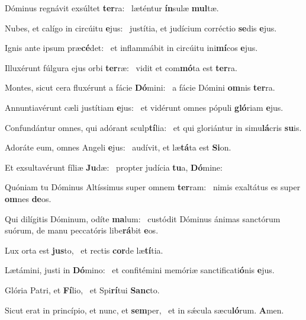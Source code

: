 \item Dóminus regnávit exsúltet \textbf{ter}ra:~\psstar{} læténtur \textbf{ín}sulæ \textbf{mul}tæ.
\item Nubes, et calígo in circúitu \textbf{e}jus:~\psstar{} justítia, et judícium corréctio \textbf{se}dis \textbf{e}jus.
\item Ignis ante ipsum præ\textbf{cé}det:~\psstar{} et inflammábit in circúitu ini\textbf{mí}cos \textbf{e}jus.
\item Illuxérunt fúlgura ejus orbi \textbf{ter}ræ:~\psstar{} vidit et com\textbf{mó}ta est \textbf{ter}ra.
\item Montes, sicut cera fluxérunt a fácie \textbf{Dó}mini:~\psstar{} a fácie Dómini \textbf{om}nis \textbf{ter}ra.
\item Annuntiavérunt cæli justítiam \textbf{e}jus:~\psstar{} et vidérunt omnes pópuli \textbf{gló}riam \textbf{e}jus.
\item Confundántur omnes, qui adórant sculp\textbf{tí}lia:~\psstar{} et qui gloriántur in simu\textbf{lá}cris \textbf{su}is.
\item Adoráte eum, omnes Angeli \textbf{e}jus:~\psstar{} audívit, et læ\textbf{tá}ta est \textbf{Si}on.
\item Et exsultavérunt fíliæ \textbf{Ju}dæ:~\psstar{} propter judícia \textbf{tu}a, \textbf{Dó}mine:
\item Quóniam tu Dóminus Altíssimus super omnem \textbf{ter}ram:~\psstar{} nimis exaltátus es super \textbf{om}nes \textbf{de}os.
\item Qui dilígitis Dóminum, odíte \textbf{ma}lum:~\psstar{} custódit Dóminus ánimas sanctórum suórum, de manu peccatóris libe\textbf{rá}bit \textbf{e}os.
\item Lux orta est \textbf{jus}to,~\psstar{} et rectis \textbf{cor}de læ\textbf{tí}tia.
\item Lætámini, justi in \textbf{Dó}mino:~\psstar{} et confitémini memóriæ sanctificati\textbf{ó}nis \textbf{e}jus.
\item Glória Patri, et \textbf{Fí}lio,~\psstar{} et Spi\textbf{rí}tui \textbf{Sanc}to.
\item Sicut erat in princípio, et nunc, et \textbf{sem}per,~\psstar{} et in sǽcula sæcu\textbf{ló}rum. \textbf{A}men.
